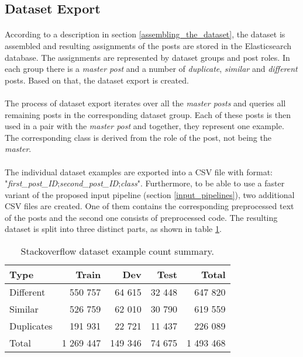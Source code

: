 \subsection{Dataset Export}
\paragraph{}
According to a description in section \ref{assembling_the_dataset}, the dataset is assembled and resulting assignments of the posts are stored in the Elasticsearch database. The assignments are represented by dataset groups and post roles. In each group there is a \textit{master post} and a number of \textit{duplicate}, \textit{similar} and \textit{different} posts. Based on that, the dataset export is created.

\paragraph{}
The process of dataset export iterates over all the \textit{master posts} and queries all remaining posts in the corresponding dataset group. Each of these posts is then used in a pair with the \textit{master post} and together, they represent one example. The corresponding class is derived from the role of the post, not being the \textit{master}.

\paragraph{}
The individual dataset examples are exported into a CSV file with format: "\textit{first\_post\_ID};\textit{second\_post\_ID};\textit{class}". Furthermore, to be able to use a faster variant of the proposed input pipeline (section \ref{input_pipelines}), two additional CSV files are created. One of them contains the corresponding preprocessed text of the posts and the second one consists of preprocessed code. The resulting dataset is split into three distinct parts, as shown in table \ref{dataset_final_counts}.

\begin{table}[h!]
	\begin{center}
		\begin{tabular}{l || r r r r} 
			\hline
			\textbf{Type} & \textbf{Train} & \textbf{Dev} & \textbf{Test} & \textbf{Total} \\ [0.5ex] 
			\hline\hline
			Different & 550 757 & 64 615 & 32 448 & 647 820 \\
			Similar & 526 759 & 62 010 & 30 790 & 619 559 \\
			Duplicates & 191 931 & 22 721 & 11 437 & 226 089 \\
			\hline
			Total & 1 269 447 & 149 346 & 74 675 & 1 493 468 \\
			\hline
		\end{tabular}
	\end{center}
	\caption{Stackoverflow dataset example count summary.}
	\label{dataset_final_counts}
\end{table}

